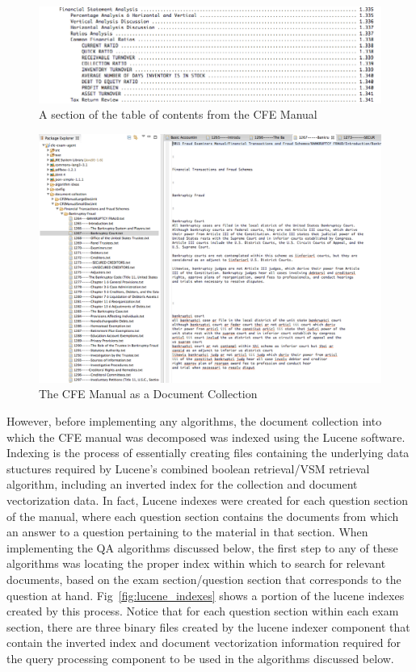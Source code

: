 \begin{figure}
\centering
\vspace{1.0in}
\includegraphics[width=150mm]{cfe_manual_toc.png}
\caption{A section of the table of contents from the CFE Manual}
\label{fig:cfe_manual_toc}
\end{figure}

\begin{figure}
\centering
\vspace{1.0in}
\includegraphics[width=150mm]{document_collection.png}
\caption{The CFE Manual as a Document Collection}
\label{fig:document_collection}
\end{figure}

However, before implementing any algorithms, the document collection into which the CFE manual was decomposed was indexed using the Lucene software.  Indexing is the process of essentially creating files containing the underlying data stuctures required by Lucene's combined boolean retrieval/VSM retrieval algorithm, including an inverted index for the collection and document vectorization data.  In fact, Lucene indexes were created for each question section of the manual, where each question section contains the documents from which an answer to a question pertaining to the material in that section.  When implementing the QA algorithms discussed below, the first step to any of these algorithms was locating the proper index within which to search for relevant documents, based on the exam section/question section that corresponds to the question at hand.  Fig~\ref{fig:lucene_indexes} shows a portion of the lucene indexes created by this process.  Notice that for each question section within each exam section, there are three binary files created by the lucene indexer component that contain the inverted index and document vectorization information required for the query processing component to be used in the algorithms discussed below.

